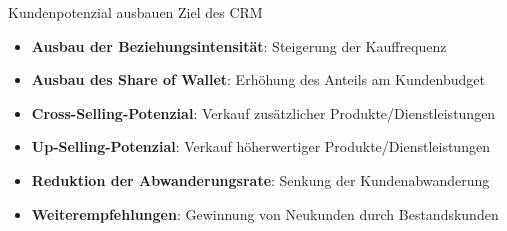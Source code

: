 \begin{concept}{Kundenpotenzial ausbauen} Ziel des CRM
\begin{itemize}
    \item \textbf{Ausbau der Beziehungsintensität}: Steigerung der Kauffrequenz
    \item \textbf{Ausbau des Share of Wallet}: Erhöhung des Anteils am Kundenbudget
    \item \textbf{Cross-Selling-Potenzial}: Verkauf zusätzlicher Produkte/Dienstleistungen
    \item \textbf{Up-Selling-Potenzial}: Verkauf höherwertiger Produkte/Dienstleistungen
    \item \textbf{Reduktion der Abwanderungsrate}: Senkung der Kundenabwanderung
    \item \textbf{Weiterempfehlungen}: Gewinnung von Neukunden durch Bestandskunden
\end{itemize}
\end{concept}



